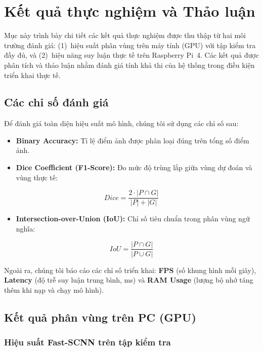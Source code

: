\documentclass[conference]{IEEEtran}
\begin{document}
\section{Kết quả thực nghiệm và Thảo luận}

Mục này trình bày chi tiết các kết quả thực nghiệm được thu thập từ hai môi trường đánh giá: (1)~hiệu suất phân vùng trên máy tính (GPU) với tập kiểm tra đầy đủ, và (2)~hiệu năng suy luận thực tế trên Raspberry Pi~4. Các kết quả được phân tích và thảo luận nhằm đánh giá tính khả thi của hệ thống trong điều kiện triển khai thực tế.

\subsection{Các chỉ số đánh giá}

Để đánh giá toàn diện hiệu suất mô hình, chúng tôi sử dụng các chỉ số sau:

\begin{itemize}
  \item \textbf{Binary Accuracy:} Tỉ lệ điểm ảnh được phân loại đúng trên tổng số điểm ảnh.
  \item \textbf{Dice Coefficient (F1-Score):} Đo mức độ trùng lắp giữa vùng dự đoán và vùng thực tế:
\end{itemize}
\begin{equation}
Dice = \frac{2 \cdot |P \cap G|}{|P| + |G|}
\end{equation}

\begin{itemize}
  \item \textbf{Intersection-over-Union (IoU):} Chỉ số tiêu chuẩn trong phân vùng ngữ nghĩa:
\end{itemize}
\begin{equation}
IoU = \frac{|P \cap G|}{|P \cup G|}
\end{equation}

Ngoài ra, chúng tôi báo cáo các chỉ số triển khai: \textbf{FPS} (số khung hình mỗi giây), \textbf{Latency} (độ trễ suy luận trung bình, ms) và \textbf{RAM Usage} (lượng bộ nhớ tăng thêm khi nạp và chạy mô hình).

\subsection{Kết quả phân vùng trên PC (GPU)}

\subsubsection{Hiệu suất Fast-SCNN trên tập kiểm tra}
\end{document}

